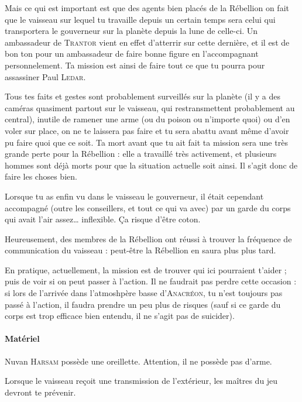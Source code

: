 \documentclass{article}
\begin{document}
{{Mais ce qui est important est que des agents bien placés de la Rébellion on fait que le vaisseau sur lequel tu travaille depuis un certain temps sera celui qui transportera le gouverneur sur la planète depuis la lune de celle-ci.
Un ambassadeur de \textsc{Trantor} vient en effet d’atterrir sur cette dernière, et il est de bon ton pour un ambassadeur de faire bonne figure en l’accompagnant personnelement.
Ta mission est ainsi de faire tout ce que tu pourra pour assassiner Paul \textsc{Ledar}.

Tous tes faits et gestes sont probablement surveillés sur la planète (il y a des caméras quasiment partout sur le vaisseau, qui restransmettent probablement au central), inutile de ramener une arme (ou du poison ou n’importe quoi) ou d’en voler sur place, on ne te laissera pas faire et tu sera abattu avant même d’avoir pu faire quoi que ce soit.
Ta mort avant que tu ait fait ta mission sera une très grande perte pour la Rébellion : elle a travaillé très activement, et plusieurs hommes sont déjà morts pour que la situation actuelle soit ainsi.
Il s’agit donc de faire les choses bien.

Lorsque tu as enfin vu dans le vaisseau le gouverneur, il était cependant accompagné (outre les conseillers, et tout ce qui va avec) par un garde du corps qui avait l’air assez… inflexible.
Ça risque d’être coton.

Heureusement, des membres de la Rébellion ont réussi à trouver la fréquence de communication du vaisseau : peut-être la Rébellion en saura plus plus tard.

En pratique, actuellement, la mission est de trouver qui ici pourraient t’aider ; puis de voir si on peut passer à l’action.
Il ne faudrait pas perdre cette occasion : si lors de l’arrivée dans l’atmoshpère basse d’\textsc{Anacréon}, tu n’est toujours pas passé à l’action, il faudra prendre un peu plus de risques (sauf si ce garde du corps est trop efficace bien entendu, il ne s’agit pas de suicider).
}

\paragraph{Matériel}
{
Nuvan \textsc{Harsam} possède une oreillette.
Attention, il ne possède pas d’arme.

Lorsque le vaisseau reçoit une transmission de l’extérieur, les maîtres du jeu devront te prévenir.
}
}
\end{document}
